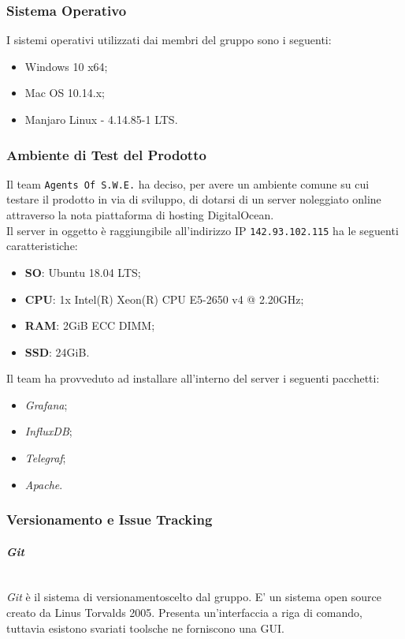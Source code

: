 \subsubsection{Sistema Operativo}
	I sistemi operativi utilizzati dai membri del gruppo sono i seguenti:
	\begin{itemize}
	\item Windows 10 x64;
	\item Mac OS 10.14.x;
	\item Manjaro Linux - 4.14.85-1 LTS.
	\end{itemize}

\subsubsection{Ambiente di Test del Prodotto}\label{Server}
Il team \texttt{Agents Of S.W.E.} ha deciso, per avere un ambiente comune su cui testare il prodotto in via di sviluppo, di dotarsi di un server noleggiato online attraverso la nota piattaforma di hosting DigitalOcean\glossario.\\
Il server in oggetto è raggiungibile all'indirizzo IP \texttt{142.93.102.115} ha le seguenti caratteristiche:
\begin{itemize}
	\item \textbf{SO}: Ubuntu 18.04 LTS;
	\item \textbf{CPU}: 1x Intel(R) Xeon(R) CPU E5-2650 v4 @ 2.20GHz;
	\item \textbf{RAM}: 2GiB ECC DIMM;
	\item \textbf{SSD}: 24GiB.
\end{itemize}
Il team ha provveduto ad installare all'interno del server i seguenti pacchetti:
\begin{itemize}
	\item \textit{Grafana};
	\item \textit{InfluxDB};
	\item \textit{Telegraf};
	\item \textit{Apache}\glossario.
\end{itemize}

\subsubsection{Versionamento e Issue Tracking}

\paragraph{\textit{Git}} ~\\
	\textit{Git} è il sistema di versionamento\glossario scelto dal gruppo. E' un sistema open source creato da Linus 	Torvalds 2005. Presenta un'interfaccia a riga di comando, tuttavia esistono svariati tools\glossario 	che 	ne forniscono una GUI.


